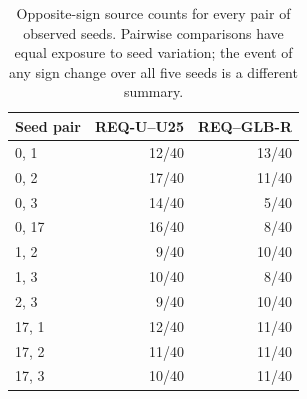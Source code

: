 \begin{table}[!t]
\centering\small
\caption{Opposite-sign source counts for every pair of observed seeds. Pairwise comparisons have equal exposure to seed variation; the event of any sign change over all five seeds is a different summary.}
\label{tab:r91-signs}
\begin{tabular}{lrr}
\toprule
Seed pair & REQ-U--U25 & REQ--GLB-R\\
\midrule
0, 1 & 12/40 & 13/40\\
0, 2 & 17/40 & 11/40\\
0, 3 & 14/40 & 5/40\\
0, 17 & 16/40 & 8/40\\
1, 2 & 9/40 & 10/40\\
1, 3 & 10/40 & 8/40\\
2, 3 & 9/40 & 10/40\\
17, 1 & 12/40 & 11/40\\
17, 2 & 11/40 & 11/40\\
17, 3 & 10/40 & 11/40\\
\bottomrule
\end{tabular}
\end{table}
